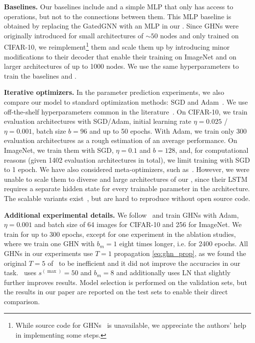 \textbf{Baselines.} Our baselines include \ghnbase and a simple MLP that only has access to operations, but not to the connections between them.
This MLP baseline is obtained by replacing the GatedGNN with an MLP in our \ghnours.
Since GHNs were originally introduced for small architectures of $\sim50$ nodes and only trained on CIFAR-10, we reimplement\footnote{While source code for GHNs~\citep{zhang2018graph} is unavailable, we appreciate the authors' help in implementing some steps.} them and scale them up by introducing minor modifications to their decoder that enable their training on ImageNet and on larger architectures of up to 1000 nodes.
We use the same hyperparameters to train the baselines and \ghnours.

\textbf{Iterative optimizers.}
In the parameter prediction experiments, we also compare our model to standard optimization methods: SGD and Adam~\citep{kingma2014adam}.
We use off-the-shelf hyperparameters common in the literature~\citep{zhang2018graph,liu2018darts,chen2019progressive,yang2020cars,he2020milenas,li2020sgas}. On CIFAR-10, we train evaluation architectures with SGD/Adam, initial learning rate $\eta=0.025$ / $\eta=0.001$, batch size $b=96$ and up to 50 epochs. With Adam, we train only 300 evaluation architectures as a rough estimation of an average performance.
On ImageNet, we train them with SGD, $\eta=0.1$ and $b=128$,
and, for computational reasons (given 1402 evaluation architectures in total), we limit training with SGD to 1 epoch.
We have also considered meta-optimizers, such as~\citep{andrychowicz2016learning,ravi2016optimization}. However, we were unable to scale them to diverse and large architectures of our \dataset, since their LSTM requires a separate hidden state for every trainable parameter in the architecture. The scalable variants exist~\citep{wichrowska2017learned,metz2020tasks}, but are hard to reproduce without open source code.

\textbf{Additional experimental details.}
We follow~\citep{zhang2018graph} and train GHNs with Adam, $\eta=0.001$ and batch size of 64 images for CIFAR-10 and 256 for ImageNet. We train for up to 300 epochs, except for one experiment in the ablation studies,
where we train one GHN with $b_m = 1$ eight times longer, i.e. for 2400 epochs.
All GHNs in our experiments use $T=1$ propagation \eqref{eq:ghn_prop}, as we found the original $T=5$ of~\citep{zhang2018graph} to be inefficient and it did not improve the accuracies in our task.
\ghnours~uses $s^{(\max)}=50$ and $b_m=8$ and additionally uses LN that slightly further improves results.
Model selection is performed on the validation sets, but the results in our paper are reported on the test sets to enable their direct comparison.

